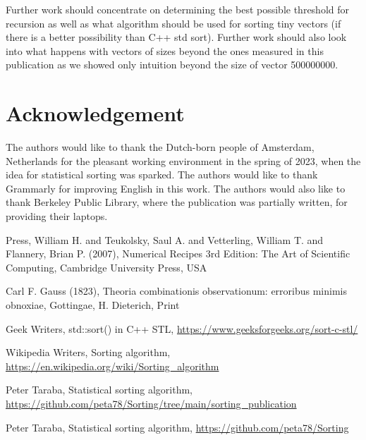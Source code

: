 \documentclass[12pt]{article}
\begin{document}
	Further work should concentrate on determining the best possible threshold for recursion as well as what algorithm should be used for sorting tiny vectors (if there is a better possibility than C++ std sort). Further work should also look into what happens with vectors of sizes beyond the ones measured in this publication as we showed only intuition beyond the size of vector 500000000.
	
	\section*{Acknowledgement}
	
	The authors would like to thank the Dutch-born people of Amsterdam, Netherlands for the pleasant working environment in the spring of 2023, when the idea for statistical sorting was sparked. The authors would like to thank Grammarly for improving English in this work. The authors would also like to thank Berkeley Public Library, where the publication was partially written, for providing their laptops.
	
\begin{thebibliography}{9}
Press, William H. and Teukolsky, Saul A. and Vetterling, William T. and Flannery, Brian P. (2007), Numerical Recipes 3rd Edition: The Art of Scientific Computing, Cambridge University Press, USA

Carl F. Gauss (1823), Theoria combinationis observationum: erroribus minimis obnoxiae, Gottingae, H. Dieterich, Print

Geek Writers, std::sort() in C++ STL, \url{https://www.geeksforgeeks.org/sort-c-stl/}

Wikipedia Writers, Sorting algorithm, \url{https://en.wikipedia.org/wiki/Sorting_algorithm}

Peter Taraba, Statistical sorting algorithm, \url{https://github.com/peta78/Sorting/tree/main/sorting_publication}

Peter Taraba, Statistical sorting algorithm, \url{https://github.com/peta78/Sorting}

\end{thebibliography}

	
	
\end{document}
